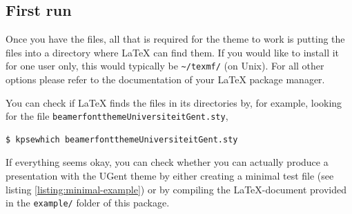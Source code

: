 \documentclass[a4paper,10pt]{article}
\begin{document}
\subsection{First run}
Once you have the files, all that is required for the theme to work is putting the files into a directory where \LaTeX{} can find them. If you would like to install it for one user only, this would typically be \lstinline{~/texmf/} (on Unix). For all other options please refer to the documentation of your \LaTeX{} package manager.

You can check if \LaTeX{} finds the files in its directories by, for example, looking for the file \lstinline!beamerfontthemeUniversiteitGent.sty!,
\begin{lstlisting}
$ kpsewhich beamerfontthemeUniversiteitGent.sty
\end{lstlisting}

If everything seems okay, you can check whether you can actually produce a presentation with the UGent theme by either creating a minimal test file (see listing \ref{listing:minimal-example}) or by compiling the \LaTeX-document provided in the \lstinline!example/! folder of this package. 
\end{document}
